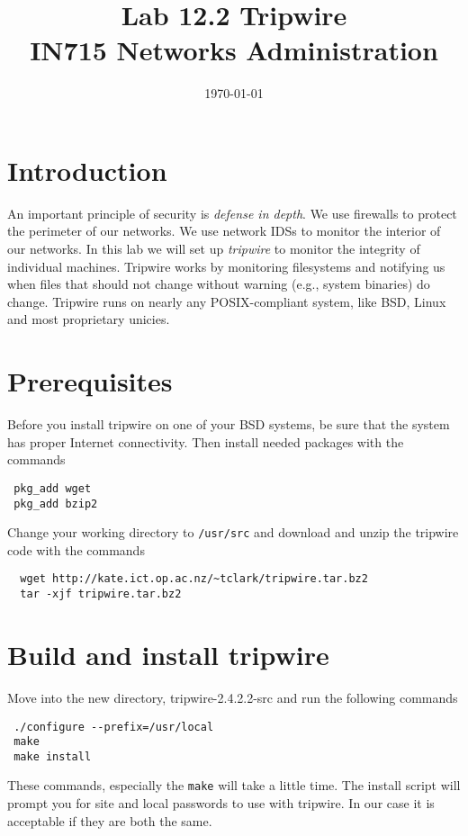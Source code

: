\documentclass{article}
\begin{document}
\title{ Lab 12.2 Tripwire\\ IN715 Networks Administration}
\date{\today}
\maketitle

\section*{Introduction}
An important principle of security is \emph{defense in depth}.  We use firewalls to protect the perimeter of our networks.  We use network IDSs to monitor the interior of our networks.  In this lab we will set up \emph{tripwire} to monitor the integrity of individual machines. Tripwire works by monitoring filesystems and notifying us when files that should not change without warning (e.g., system binaries) do change.  Tripwire runs on nearly any POSIX-compliant system, like BSD, Linux and most proprietary unicies.

\section{Prerequisites}
Before you install tripwire on one of your BSD systems, be sure that the system has proper Internet connectivity.  Then install needed packages with the commands

\begin{verbatim}
 pkg_add wget
 pkg_add bzip2
\end{verbatim}

Change your working directory to \texttt{/usr/src} and download and unzip the tripwire code with the commands

\begin{verbatim}
  wget http://kate.ict.op.ac.nz/~tclark/tripwire.tar.bz2
  tar -xjf tripwire.tar.bz2
\end{verbatim}

\section{Build and install tripwire}
Move into the new directory, {tripwire-2.4.2.2-src} and run the following commands

\begin{verbatim}
 ./configure --prefix=/usr/local
 make 
 make install
 \end{verbatim}

These commands, especially the \texttt{make} will take a little time. The install script will prompt you for site and local passwords to use with tripwire.  In our case it is acceptable if they are both the same.
\end{document}
